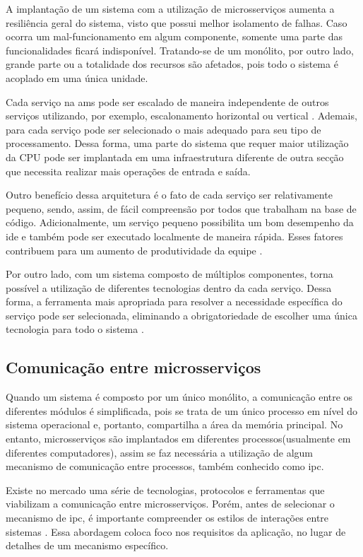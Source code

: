 A implantação de um sistema com a utilização de microsserviços aumenta a resiliência geral do sistema, visto que possui melhor isolamento de falhas. Caso ocorra um mal-funcionamento em algum componente, somente uma parte das funcionalidades ficará indisponível. Tratando-se de um monólito, por outro lado, grande parte ou a totalidade dos recursos são afetados, pois todo o sistema é acoplado em uma única unidade.

Cada serviço na \acrshort{ams} pode ser escalado de maneira independente de outros serviços utilizando, por exemplo, escalonamento horizontal ou vertical \cite{richardson2018microservices}. Ademais, para cada serviço pode ser selecionado o  mais adequado para seu tipo de processamento. Dessa forma, uma parte do sistema que requer maior utilização da CPU pode ser implantada em uma infraestrutura diferente de outra secção que necessita realizar mais operações de entrada e saída.

Outro benefício dessa arquitetura é o fato de cada serviço ser relativamente pequeno, sendo, assim, de fácil compreensão por todos que trabalham na base de código. Adicionalmente, um serviço pequeno possibilita um bom desempenho da \acrfull{ide} e também pode ser executado localmente de maneira rápida. Esses fatores contribuem para um aumento de produtividade da equipe \cite{richardson2018microservices}.

Por outro lado, com um sistema composto de múltiplos componentes, torna possível a utilização de diferentes tecnologias dentro da cada serviço. Dessa forma, a ferramenta mais apropriada para resolver a necessidade específica do serviço pode ser selecionada, eliminando a obrigatoriedade de escolher uma única tecnologia para todo o sistema \cite{buildingMicroservices}.

\subsection{Comunicação entre microsserviços}
Quando um sistema é composto por um único monólito, a comunicação entre os diferentes módulos é simplificada, pois se trata de um único processo em nível do sistema operacional e, portanto, compartilha a área da memória principal. No entanto, microsserviços são implantados em diferentes processos(usualmente em diferentes computadores), assim se faz necessária a utilização de algum mecanismo de comunicação entre processos, também conhecido como \acrfull{ipc}.

Existe no mercado uma série de tecnologias, protocolos e ferramentas que viabilizam a comunicação entre microsserviços. Porém, antes de selecionar o mecanismo de \acrshort{ipc}, é importante compreender os estilos de interações entre sistemas \cite{richardson2018microservices}. Essa abordagem coloca foco nos requisitos da aplicação, no lugar de detalhes de um mecanismo específico.

